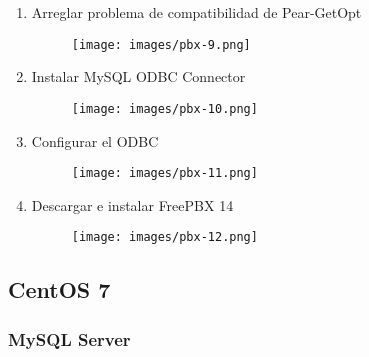 \documentclass{article}
\begin{document}
\begin{enumerate}
  \item Arreglar problema de compatibilidad de Pear-GetOpt
  \begin{figure}[!h]
    \centering
      \texttt{[image: images/pbx-9.png]}
    \label{fig:graph}
  \end{figure}
  
  \item Instalar MySQL ODBC Connector
  \begin{figure}[!h]
    \centering
      \texttt{[image: images/pbx-10.png]}
    \label{fig:graph}
  \end{figure}
  
  \item Configurar el ODBC
  \begin{figure}[!h]
    \centering
      \texttt{[image: images/pbx-11.png]}
    \label{fig:graph}
  \end{figure}
  
  \item Descargar e instalar FreePBX 14
  \begin{figure}[!h]
    \centering
      \texttt{[image: images/pbx-12.png]}
    \label{fig:graph}
  \end{figure}
\end{enumerate}

\subsection{CentOS 7}
\subsubsection{MySQL Server}
\end{document}
